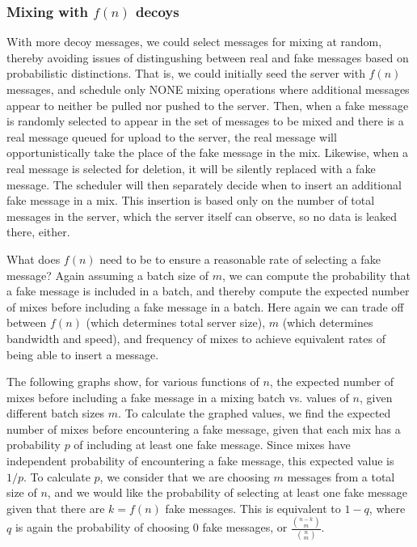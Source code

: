 \documentclass[pageno]{jpaper}
\begin{document}
\subsubsection{Mixing with \texorpdfstring{$f(n)$}{f(n)} decoys}
\label{fofn}
With more decoy messages, we could select messages for mixing at random, thereby avoiding issues of distingushing between real and fake messages based on probabilistic distinctions. That is, we could initially seed the server with $f(n)$ messages, and schedule only NONE mixing operations where additional messages appear to neither be pulled nor pushed to the server. Then, when a fake message is randomly selected to appear in the set of messages to be mixed and there is a real message queued for upload to the server, the real message will opportunistically take the place of the fake message in the mix. Likewise, when a real message is selected for deletion, it will be silently replaced with a fake message. The scheduler will then separately decide when to insert an additional fake message in a mix. This insertion is based only on the number of total messages in the server, which the server itself can observe, so no data is leaked there, either.

What does $f(n)$ need to be to ensure a reasonable rate of selecting a fake message? Again assuming a batch size of $m$, we can compute the probability that a fake message is included in a batch, and thereby compute the expected number of mixes before including a fake message in a batch. Here again we can trade off between $f(n)$ (which determines total server size), $m$ (which determines bandwidth and speed), and frequency of mixes to achieve equivalent rates of being able to insert a message.

The following graphs show, for various functions of $n$, the expected number of mixes before including a fake message in a mixing batch vs. values of $n$, given different batch sizes $m$. To calculate the graphed values, we find the expected number of mixes before encountering a fake message, given that each mix has a probability $p$ of including at least one fake message. Since mixes have independent probability of encountering a fake message, this expected value is $1/p$. To calculate $p$, we consider that we are choosing $m$ messages from a total size of $n$, and we would like the probability of selecting at least one fake message given that there are $k=f(n)$ fake messages. This is equivalent to $1-q$, where $q$ is again the probability of choosing 0 fake messages, or $\frac{{{n-k}\choose m}}{{n \choose m}}$.
\end{document}
